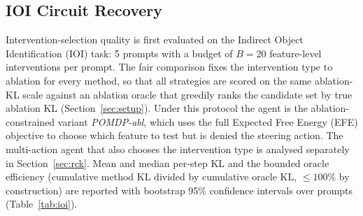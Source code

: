 
\subsection{IOI Circuit Recovery}

Intervention-selection quality is first evaluated on the Indirect Object
Identification (IOI) task: 5 prompts with a budget of $B=20$
feature-level interventions per prompt.  The fair comparison fixes the
intervention type to ablation for every method, so that all
strategies are scored on the same ablation-KL scale against an
ablation oracle that greedily ranks the candidate set by true ablation
KL (Section~\ref{sec:setup}).  Under this protocol the agent is the
ablation-constrained variant \emph{POMDP-abl}, which uses the full
Expected Free Energy (EFE) objective to choose which feature to
test but is denied the steering action.  The multi-action agent that
also chooses the intervention type is analysed separately in
Section~\ref{sec:rck}.  Mean and median per-step KL and the
bounded oracle efficiency (cumulative method KL divided by
cumulative oracle KL, $\leq 100\%$ by construction) are reported with bootstrap
95\% confidence intervals over prompts (Table~\ref{tab:ioi}).

